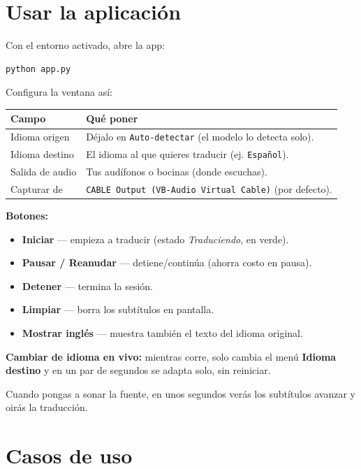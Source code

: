 \documentclass[11pt,a4paper]{article}
\begin{document}
\section{Usar la aplicación}

Con el entorno activado, abre la app:
\begin{lstlisting}
python app.py
\end{lstlisting}

Configura la ventana así:

\begin{tabularx}{\textwidth}{@{}l Y@{}}
\toprule
\textbf{Campo} & \textbf{Qué poner} \\
\midrule
Idioma origen & Déjalo en \texttt{Auto-detectar} (el modelo lo detecta solo). \\
Idioma destino & El idioma al que quieres traducir (ej. \texttt{Español}). \\
Salida de audio & Tus audífonos o bocinas (donde escuchas). \\
Capturar de & \texttt{CABLE Output (VB-Audio Virtual Cable)} (por defecto). \\
\bottomrule
\end{tabularx}

\vspace{0.8em}
\noindent\textbf{Botones:}
\begin{itemize}[leftmargin=*,nosep]
  \item \textbf{Iniciar} --- empieza a traducir (estado \textit{Traduciendo}, en verde).
  \item \textbf{Pausar / Reanudar} --- detiene/continúa (ahorra costo en pausa).
  \item \textbf{Detener} --- termina la sesión.
  \item \textbf{Limpiar} --- borra los subtítulos en pantalla.
  \item \textbf{Mostrar inglés} --- muestra también el texto del idioma original.
\end{itemize}

\vspace{0.5em}
\noindent\textbf{Cambiar de idioma en vivo:} mientras corre, solo cambia el menú
\textbf{Idioma destino} y en un par de segundos se adapta solo, sin reiniciar.

Cuando pongas a sonar la fuente, en unos segundos verás los subtítulos avanzar y
oirás la traducción.

\section{Casos de uso}
\end{document}
